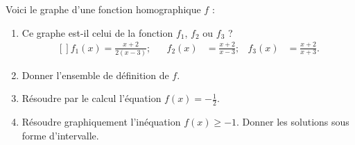 
\begin{exercice}\label{exosmath-0717}

    Voici le graphe d'une fonction homographique \( f\) :

\begin{center}
   
\end{center}

\begin{enumerate}
    \item
        Ce graphe est-il celui de la fonction \( f_1\), \( f_2\) ou \( f_3\) ?
        \begin{equation}
            \begin{aligned}[]
                f_1(x)=\frac{ x+2 }{ 2(x-3) };&&f_2(x)&=\frac{ x+2 }{ x-3 };&f_3(x)&=\frac{ x+2 }{ x+3 }.
            \end{aligned}
        \end{equation}
    \item
        Donner l'ensemble de définition de \( f\).
    \item
        Résoudre par le calcul l'équation \( f(x)=-\frac{ 1 }{2}\).
    \item
        Résoudre graphiquement l'inéquation \( f(x)\geq -1\). Donner les solutions sous forme d'intervalle.
\end{enumerate}


\end{exercice}
